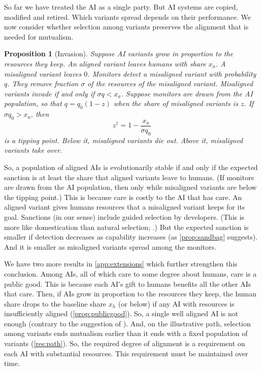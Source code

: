 \documentclass[article, 11pt, reqno]{amsart}
\newtheorem{proposition}[theorem]{Proposition}
\theoremstyle{named}
\theoremstyle{plain}
\begin{document}
So far we have treated the AI as a single party. But AI systems are copied, modified and retired. Which variants spread depends on their performance. We now consider whether selection among variants preserves the alignment that is needed for mutualism.

\begin{proposition}[Invasion]\label{prop:invasion}
Suppose AI variants grow in proportion to the resources they keep. An aligned variant leaves humans with share $x_a$. A misaligned variant leaves $0$. Monitors detect a misaligned variant with probability $q$. They remove fraction $\sigma$ of the resources of the misaligned variant. Misaligned variants invade if and only if $\sigma q < x_a$. Suppose monitors are drawn from the AI population, so that $q = q_0(1-z)$ when the share of misaligned variants is $z$. If $\sigma q_0 > x_a$, then
\[
z^\dagger = 1 - \frac{x_a}{\sigma q_0}
\]
is a tipping point. Below it, misaligned variants die out. Above it, misaligned variants take over.
\end{proposition}

So, a population of aligned AIs is evolutionarily stable if and only if the expected sanction is at least the share that aligned variants leave to humans. (If monitors are drawn from the AI population, then only while misaligned variants are below the tipping point.) This is because care is costly to the AI that has care. An aligned variant gives humans resources that a misaligned variant keeps for its goal. Sanctions (in our sense) include guided selection by developers. (This is more like domestication than natural selection; \citealp{BoudryFriederich2025}.) But the expected sanction is smaller if detection decreases as capability increases (as \cref{prop:sandbag} suggests). And it is smaller as misaligned variants spread among the monitors.

We have two more results in \cref{app:extensions} which further strengthen this conclusion. Among AIs, all of which care to some degree about humans, care is a public good. This is because each AI's gift to humans benefits all the other AIs that care. Then, if AIs grow in proportion to the resources they keep, the human share drops to the baseline share $x_h$ (or below) if any AI with resources is insufficiently aligned (\cref{prop:publicgood}). So, a single well aligned AI is not enough (contrary to the suggestion of \citet{CappelenGoldsteinHawthorne2025Responses}). And, on the illustrative path, selection among variants ends mutualism earlier than it ends with a fixed population of variants (\cref{res:path}). So, the required degree of alignment is a requirement on each AI with substantial resources. This requirement must be maintained over time.
\end{document}
